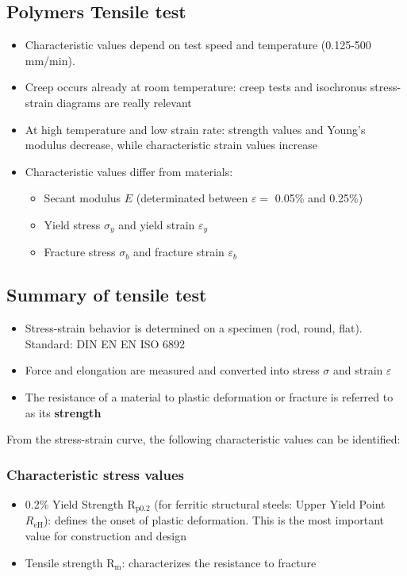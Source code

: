 \documentclass{article}
\begin{document}
\vspace*{-6cm}
\subsection{Polymers Tensile test}
\begin{itemize}
  \item Characteristic values depend on test speed and temperature (0.125-500 mm/min).
  \item Creep occurs already at room temperature: creep tests and isochronus stress-strain diagrams are really relevant
  \item At high temperature and low strain rate: strength values and Young's modulus decrease, while characteristic strain values increase
  \item Characteristic values differ from materials:
  \begin{itemize}
    \item Secant modulus $E$ (determinated between $\varepsilon =$ 0.05\% and 0.25\%)
    \item Yield stress $\sigma_y$ and yield strain $\varepsilon_y$
    \item Fracture stress $\sigma_b$ and fracture strain $\varepsilon_b$
  \end{itemize}
\end{itemize}

\subsection{Summary of tensile test}
\begin{itemize}
  \item Stress-strain behavior is determined on a specimen (rod, round, flat). Standard: DIN EN EN ISO 6892
  \item Force and elongation are measured and converted into stress $\sigma$ and strain $\varepsilon$
  \item The resistance of a material to plastic deformation or fracture is referred to as its \textbf{strength}
\end{itemize}

From the stress-strain curve, the following characteristic values can be identified:
\subsubsection{Characteristic stress values}
\begin{itemize}
  \item 0.2\% Yield Strength R$_\text{p0.2}$ (for ferritic structural steels: Upper Yield Point $R_\text{eH}$):
    defines the onset of plastic deformation. This is the most important value for construction and design
  \item Tensile strength R$_\mathrm{m}$: characterizes the resistance to fracture
\end{itemize}
\end{document}
